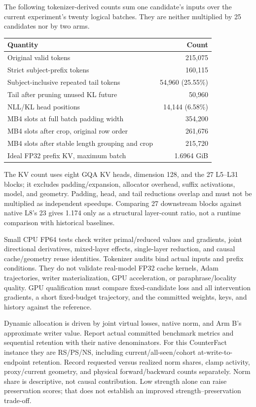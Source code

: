 \documentclass[11pt]{article}
\begin{document}
The following tokenizer-derived counts sum one candidate's inputs over
the current experiment's twenty logical batches. They are neither
multiplied by 25 candidates nor by two arms.
\begin{center}
\begin{tabular}{lr}
\toprule
Quantity & Count\\
\midrule
Original valid tokens & 215,075\\
Strict subject-prefix tokens & 160,115\\
Subject-inclusive repeated tail tokens & 54,960 (25.55\%)\\
Tail after pruning unused KL future & 50,960\\
NLL/KL head positions & 14,144 (6.58\%)\\
MB4 slots at full batch padding width & 354,200\\
MB4 slots after crop, original row order & 261,676\\
MB4 slots after stable length grouping and crop & 215,720\\
Ideal FP32 prefix KV, maximum batch & 1.6964 GiB\\
\bottomrule
\end{tabular}
\end{center}
The KV count uses eight GQA KV heads, dimension 128, and the 27 L5--L31 blocks;
it excludes padding/expansion, allocator overhead, suffix activations,
model, and geometry. Padding, head, and tail reductions overlap and must
not be multiplied as independent speedups. Comparing 27 downstream blocks
against native L8's 23 gives 1.174 only as a structural layer-count ratio,
not a runtime comparison with historical baselines.

Small CPU FP64 tests check writer primal/reduced values and gradients,
joint directional derivatives, mixed-layer effects, single-layer reduction,
and causal cache/geometry reuse identities. Tokenizer audits bind actual
inputs and prefix conditions. They do not validate real-model FP32 cache
kernels, Adam trajectories, writer materialization, GPU acceleration, or
paraphrase/locality quality. GPU qualification must compare fixed-candidate
loss and all intervention gradients, a short fixed-budget trajectory,
and the committed weights, keys, and history against the reference.

Dynamic allocation is driven by joint virtual losses, native norm, and
Arm B's approximate writer value. Report actual committed benchmark
metrics and sequential retention with their native denominators. For this
CounterFact instance they are RS/PS/NS, including current/all-seen/cohort
at-write-to-endpoint retention. Record requested versus realized norm
shares, clamp activity, proxy/current geometry, and physical forward/backward
counts separately. Norm share is descriptive, not causal contribution.
Low strength alone can raise preservation scores; that does not establish
an improved strength--preservation trade-off.
\end{document}
